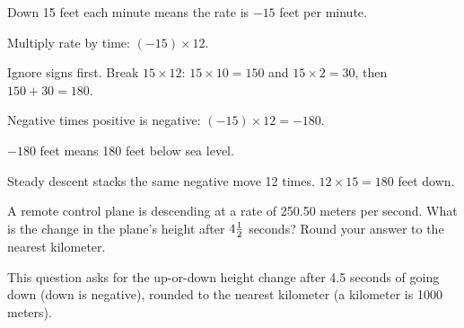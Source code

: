 \begin{steps}
  \item {}Down 15 feet each minute means the rate is $-15$ feet per minute.
  \item {}Multiply rate by time: $(-15) \times 12$.
  \item Ignore signs first. Break $15 \times 12$: $15 \times 10 = 150$ and $15 \times 2 = 30$, then $150 + 30 = 180$.
  \item Negative times positive is negative: $(-15) \times 12 = -180$.
  \item $-180$ feet means 180 feet below sea level.
\end{steps}


\noindent Steady descent stacks the same negative move 12 times. $12 \times 15 = 180$ feet down.


\noindent A remote control plane is descending at a rate of 250.50 meters per second. What is the change in the plane's height after $4\tfrac{1}{2}$ seconds? Round your answer to the nearest kilometer.


\noindent This question asks for the up-or-down height change after 4.5 seconds of going down (down is negative), rounded to the nearest kilometer (a kilometer is 1000 meters).

